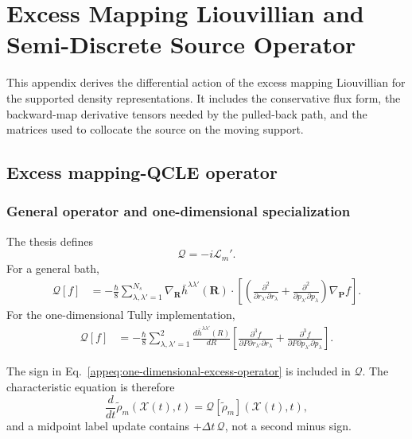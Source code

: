 \documentclass[
  11pt,
  letterpaper,
  onehalfspacing,
  normalmargins,
  equalmargins,
  oneside
]{ut-thesis}
\begin{document}
\chapter[Excess Liouvillian]{Excess Mapping Liouvillian and Semi-Discrete Source Operator}
\label{app:excess-liouvillian}

This appendix derives the differential action of the excess mapping
Liouvillian for the supported density representations. It includes the
conservative flux form, the backward-map derivative tensors needed by the
pulled-back path, and the matrices used to collocate the source on the moving
support.

\section{Excess mapping-QCLE operator}
\label{appsec:excess-operator}

\subsection{General operator and one-dimensional specialization}
\label{appsubsec:excess-operator-form}

The thesis defines
\[
\mathcal Q=-i\mathcal L_m'.
\]
For a general bath,
\begin{align}
\mathcal Q[f]
&=
-\frac{\hbar}{8}
\sum_{\lambda,\lambda'=1}^{N_s}
\nabla_{\mathbf R}
\bar h^{\lambda\lambda'}(\mathbf R)
\cdot
\left[
\left(
\frac{\partial^2}
{\partial r_{\lambda'}\partial r_\lambda}
+
\frac{\partial^2}
{\partial p_{\lambda'}\partial p_\lambda}
\right)
\nabla_{\mathbf P}f
\right].
\label{appeq:general-excess-operator}
\end{align}
For the one-dimensional Tully implementation,
\begin{align}
\mathcal Q[f]
&=
-\frac{\hbar}{8}
\sum_{\lambda,\lambda'=1}^{2}
\frac{d\bar h^{\lambda\lambda'}(R)}{dR}
\left[
\frac{\partial^3 f}
{\partial P\partial r_{\lambda'}\partial r_\lambda}
+
\frac{\partial^3 f}
{\partial P\partial p_{\lambda'}\partial p_\lambda}
\right].
\label{appeq:one-dimensional-excess-operator}
\end{align}

The sign in Eq.~\eqref{appeq:one-dimensional-excess-operator} is included in
\(\mathcal Q\).  The characteristic equation is therefore
\begin{equation}
\frac{d}{dt}
\tilde\rho_m
\left(
\boldsymbol{\mathcal X}(t),t
\right)
=
\mathcal Q[\tilde\rho_m]
\left(
\boldsymbol{\mathcal X}(t),t
\right),
\label{appeq:appendix-characteristic-density}
\end{equation}
and a midpoint label update contains \(+\Delta t\,\mathcal Q\), not a second
minus sign.
\end{document}
